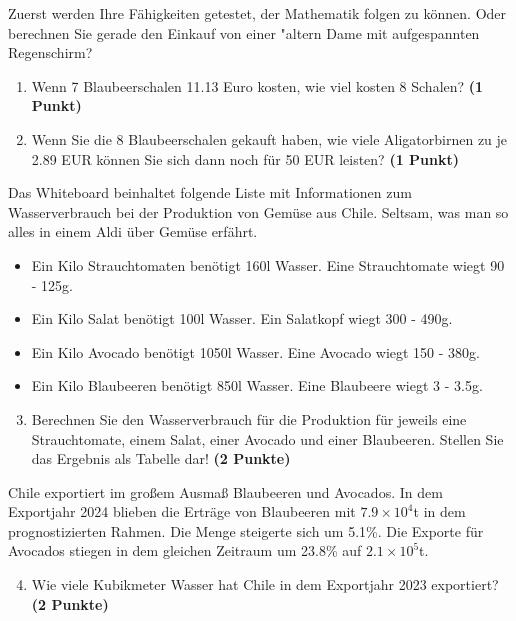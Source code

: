\documentclass[a4paper, 9pt]{scrartcl}\usepackage[]{graphicx}\usepackage[]{xcolor}
\begin{document}
Zuerst werden Ihre Fähigkeiten getestet, der Mathematik folgen zu können. Oder berechnen Sie gerade den Einkauf von einer {"a}ltern Dame mit aufgespannten Regenschirm?\\

\begin{enumerate}
\item Wenn 7 Blaubeerschalen 11.13 Euro kosten,  wie viel kosten 8 Schalen? \textbf{(1 Punkt)}
\item Wenn Sie die 8 Blaubeerschalen gekauft haben, wie viele Aligatorbirnen zu je 2.89 EUR können Sie sich dann noch für 50 EUR leisten? \textbf{(1 Punkt)}
\end{enumerate}

Das Whiteboard beinhaltet folgende Liste mit Informationen zum Wasserverbrauch bei der Produktion von Gemüse aus Chile. Seltsam, was man so alles in einem Aldi über Gemüse erfährt.
  
\begin{itemize}[noitemsep]
\item Ein Kilo Strauchtomaten benötigt 160l Wasser. Eine Strauchtomate wiegt 90 - 125g.
\item Ein Kilo Salat benötigt 100l Wasser. Ein Salatkopf wiegt 300 - 490g.
\item Ein Kilo Avocado benötigt 1050l Wasser. Eine Avocado wiegt 150 - 380g.
\item Ein Kilo Blaubeeren benötigt 850l Wasser. Eine Blaubeere wiegt 3 - 3.5g.
\end{itemize}

\begin{enumerate}
  \setcounter{enumi}{2}
\item Berechnen Sie den Wasserverbrauch für die Produktion für jeweils eine Strauchtomate, einem Salat, einer Avocado und einer Blaubeeren. Stellen Sie das Ergebnis als Tabelle dar! \textbf{(2 Punkte)}
\end{enumerate}

Chile exportiert im großem Ausmaß Blaubeeren und Avocados. In dem Exportjahr 2024 blieben die Erträge von Blaubeeren mit \ensuremath{7.9\times 10^{4}}t in dem prognostizierten Rahmen. Die Menge steigerte sich um 5.1\%. Die Exporte für Avocados stiegen in dem gleichen Zeitraum um 23.8\% auf \ensuremath{2.1\times 10^{5}}t.

\begin{enumerate}
  \setcounter{enumi}{3}
\item Wie viele Kubikmeter Wasser hat Chile in dem Exportjahr 2023 exportiert? \textbf{(2 Punkte)}
\end{enumerate}
\end{document}
